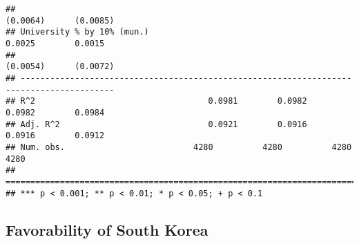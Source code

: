 \documentclass[
]{article}
\begin{document}
\begin{verbatim}
##                                                                  (0.0064)      (0.0085)  
## University % by 10% (mun.)                                        0.0025        0.0015   
##                                                                  (0.0054)      (0.0072)  
## -----------------------------------------------------------------------------------------
## R^2                                   0.0981        0.0982        0.0982        0.0984   
## Adj. R^2                              0.0921        0.0916        0.0916        0.0912   
## Num. obs.                          4280          4280          4280          4280        
## =========================================================================================
## *** p < 0.001; ** p < 0.01; * p < 0.05; + p < 0.1
\end{verbatim}

\hypertarget{favorability-of-south-korea-5}{%
\subsection{Favorability of South
Korea}\label{favorability-of-south-korea-5}}
\end{document}
